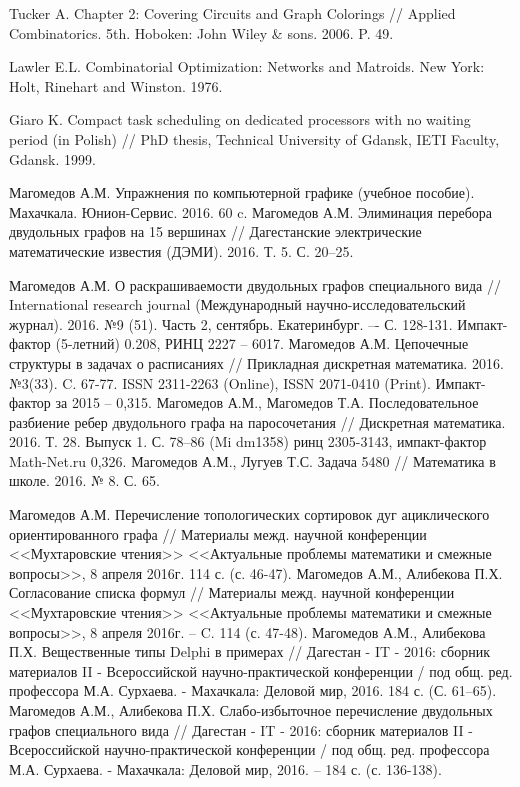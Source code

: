 \begin{thebibliography}{1}
 Tucker A. Chapter 2: Covering Circuits and Graph Colorings // Applied Combinatorics. 5th. Hoboken: John Wiley \& sons. 2006. P. 49.

 Lawler E.L. Combinatorial Optimization: Networks and Matroids.
New York: Holt, Rinehart and Winston. 1976.

 Giaro K. Compact task scheduling on dedicated processors with no waiting period (in Polish) // PhD thesis, Technical University of Gdansk, IETI Faculty, Gdansk. 1999.








Магомедов А.М. Упражнения по компьютерной графике (учебное пособие).  Махачкала. Юнион-Сервис. 2016. 60 c.
 Магомедов А.М. Элиминация перебора двудольных графов на 15 вершинах // Дагестанские электрические математические известия (ДЭМИ). 2016. Т. 5. С. 20--25.

 Магомедов А.М. О раскрашиваемости двудольных графов специального вида // International research journal (Международный научно-исследовательский журнал). 2016. №9 (51). Часть 2, сентябрь. Екатеринбург.  –- С. 128-131. Импакт-фактор (5-летний) 0.208, РИНЦ 2227 – 6017.
Магомедов А.М. Цепочечные структуры в задачах о расписаниях // Прикладная дискретная математика. 2016. №3(33). C. 67-77.  ISSN 2311-2263 (Online), ISSN 2071-0410 (Print). Импакт-фактор за 2015 – 0,315.
Магомедов А.М., Магомедов Т.А. Последовательное разбиение ребер двудольного графа на паросочетания // Дискретная математика. 2016. Т. 28. Выпуск 1. С. 78–86 (Mi dm1358) ринц 2305-3143, импакт-фактор Math-Net.ru 0,326.
Магомедов А.М., Лугуев Т.С. Задача 5480 // Математика в школе. 2016. № 8. С. 65.


Магомедов А.М. Перечисление топологических сортировок дуг ациклического ориентированного графа // Материалы межд. научной конференции <<Мухтаровские чтения>> <<Актуальные проблемы математики и смежные вопросы>>, 8 апреля 2016г. 114 с. (с. 46-47).
Магомедов А.М., Алибекова П.Х. Согласование списка формул // Материалы межд. научной конференции <<Мухтаровские чтения>> <<Актуальные проблемы математики и смежные вопросы>>, 8 апреля 2016г. -- C. 114 (с. 47-48).
Магомедов А.М., Алибекова П.Х. Вещественные типы Delphi в примерах // Дагестан - IT - 2016: сборник материалов II - Всероссийской научно-практической конференции / под общ. ред. профессора М.А. Сурхаева. - Махачкала: Деловой мир, 2016. 184 с. (С. 61--65).
Магомедов А.М., Алибекова П.Х. Слабо-избыточное перечисление двудольных графов специального вида // Дагестан - IT - 2016: сборник материалов II - Всероссийской научно-практической конференции / под общ. ред. профессора М.А. Сурхаева. - Махачкала: Деловой мир, 2016. – 184 с. (с. 136-138).



\end{thebibliography}
